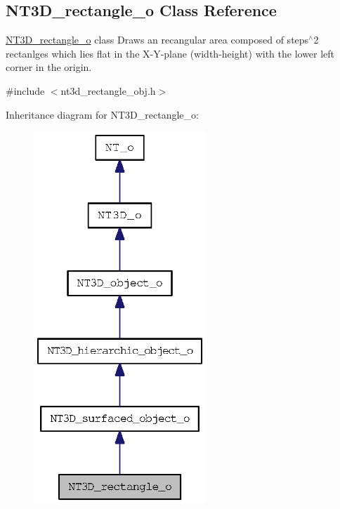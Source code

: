\subsection{NT3D\_\-rectangle\_\-o Class Reference}
\label{class_n_t3_d__rectangle__o}


\hyperlink{class_n_t3_d__rectangle__o}{NT3D\_\-rectangle\_\-o} class Draws an recangular area composed of steps$^\wedge$2 rectanlges which lies flat in the X-\/Y-\/plane (width-\/height) with the lower left corner in the origin.  




{\ttfamily \#include $<$nt3d\_\-rectangle\_\-obj.h$>$}



Inheritance diagram for NT3D\_\-rectangle\_\-o:
\nopagebreak
\begin{figure}[H]
\begin{center}
\leavevmode
\includegraphics[width=184pt]{class_n_t3_d__rectangle__o__inherit__graph}
\end{center}
\end{figure}


